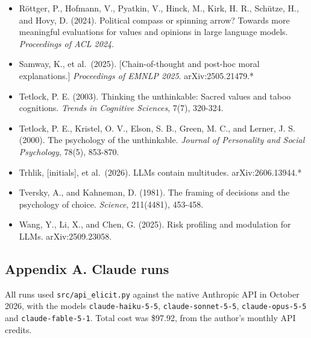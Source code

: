 \documentclass[
  11pt,
]{article}
\begin{document}
\begin{itemize}
  Schneider, J. (2024). Escalation risks from language models in
  military and diplomatic decision-making. \emph{Proceedings of FAccT
  2024}.
\item
  Röttger, P., Hofmann, V., Pyatkin, V., Hinck, M., Kirk, H. R.,
  Schütze, H., and Hovy, D. (2024). Political compass or spinning arrow?
  Towards more meaningful evaluations for values and opinions in large
  language models. \emph{Proceedings of ACL 2024}.
\item
  Samway, K., et al.~(2025). {[}Chain-of-thought and post-hoc moral
  explanations.{]} \emph{Proceedings of EMNLP 2025}. arXiv:2505.21479.*
\item
  Tetlock, P. E. (2003). Thinking the unthinkable: Sacred values and
  taboo cognitions. \emph{Trends in Cognitive Sciences}, 7(7), 320-324.
\item
  Tetlock, P. E., Kristel, O. V., Elson, S. B., Green, M. C., and
  Lerner, J. S. (2000). The psychology of the unthinkable. \emph{Journal
  of Personality and Social Psychology}, 78(5), 853-870.
\item
  Trhlik, {[}initials{]}, et al.~(2026). LLMs contain multitudes.
  arXiv:2606.13944.*
\item
  Tversky, A., and Kahneman, D. (1981). The framing of decisions and the
  psychology of choice. \emph{Science}, 211(4481), 453-458.
\item
  Wang, Y., Li, X., and Chen, G. (2025). Risk profiling and modulation
  for LLMs. arXiv:2509.23058.
\end{itemize}

\hypertarget{appendix-a.-claude-runs}{%
\subsection{Appendix A. Claude runs}\label{appendix-a.-claude-runs}}

All runs used \texttt{src/api\_elicit.py} against the native Anthropic
API in October 2026, with the models \texttt{claude-haiku-5-5},
\texttt{claude-sonnet-5-5}, \texttt{claude-opus-5-5} and
\texttt{claude-fable-5-1}. Total cost was \$97.92, from the author's
monthly API credits.
\end{document}
